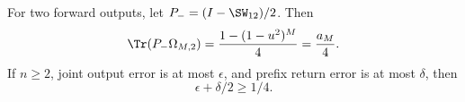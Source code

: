 \begin{theorem}\label{thm:singlet}
For two forward outputs, let $P_-=(I-\SW_{12})/2$. Then
\begin{equation}
 \Tr(P_-\Omega_{M,2})=\frac{1-(1-u^2)^M}{4}=\frac{a_M}{4}.
 \label{eq:singlet}
\end{equation}
If $n\ge2$, joint output error is at most $\epsilon$, and prefix return error is at most $\delta$, then
\begin{equation}
 \epsilon+\delta/2\ge1/4.
 \label{eq:jointobstruction}
\end{equation}
\end{theorem}
